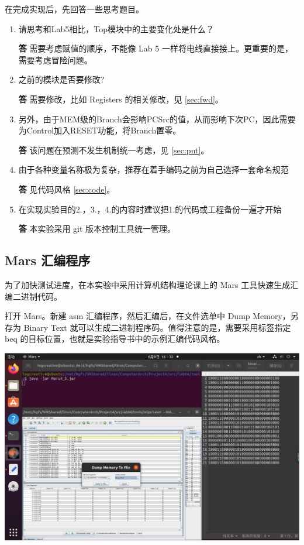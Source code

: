 \documentclass[a4paper,UTF8]{ctexart}
\begin{document}
在完成实现后，先回答一些思考题目。
\begin{enumerate}
    \item 请思考和Lab5相比，Top模块中的主要变化处是什么？\par
    \textbf{答} 需要考虑赋值的顺序，不能像 Lab 5 一样将电线直接接上。更重要的是，需要考虑冒险问题。
    \item 之前的模块是否要修改?\par
    \textbf{答} 需要修改，比如 Registers 的相关修改，见 \ref{sec:fwd}。
    \item 另外，由于MEM级的Branch会影响PCSrc的值，从而影响下次PC，因此需要为Control加入RESET功能，将Branch置零。\par
    \textbf{答} 该问题在预测不发生机制统一考虑，见 \ref{sec:pnt}。
    \item 由于各种变量名称极为复杂，推荐在着手编码之前为自己选择一套命名规范\par
    \textbf{答} 见代码风格 \ref{sec:code}。
    \item 在实现实验目的2.，3.，4.的内容时建议把1.的代码或工程备份一遍才开始\par
    \textbf{答} 本实验采用 git 版本控制工具统一管理。
\end{enumerate}

\subsection{Mars 汇编程序}

为了加快测试进度，在本实验中采用计算机结构理论课上的 Mars 工具快速生成汇编二进制代码。

打开 Mars。新建 asm 汇编程序，然后汇编后，在文件选单中 Dump Memory，另存为 Binary Text 就可以生成二进制程序码。值得注意的是，需要采用标签指定 beq 的目标位置，也就是实验指导书中的示例汇编代码风格。

\includegraphics[width=\textwidth]{mars.png}
\end{document}
